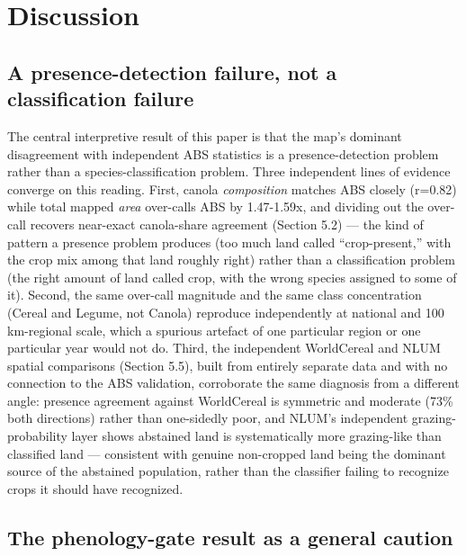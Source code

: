 
\section{Discussion}\label{discussion}

\subsection{A presence-detection failure, not a classification failure}\label{a-presence-detection-failure-not-a-classification-failure}

The central interpretive result of this paper is that the map's dominant disagreement with independent ABS statistics is a presence-detection problem rather than a species-classification problem. Three independent lines of evidence converge on this reading. First, canola \emph{composition} matches ABS closely (r=0.82) while total mapped \emph{area} over-calls ABS by 1.47-1.59x, and dividing out the over-call recovers near-exact canola-share agreement (Section 5.2) --- the kind of pattern a presence problem produces (too much land called ``crop-present,'' with the crop mix among that land roughly right) rather than a classification problem (the right amount of land called crop, with the wrong species assigned to some of it). Second, the same over-call magnitude and the same class concentration (Cereal and Legume, not Canola) reproduce independently at national and 100 km-regional scale, which a spurious artefact of one particular region or one particular year would not do. Third, the independent WorldCereal and NLUM spatial comparisons (Section 5.5), built from entirely separate data and with no connection to the ABS validation, corroborate the same diagnosis from a different angle: presence agreement against WorldCereal is symmetric and moderate (73\% both directions) rather than one-sidedly poor, and NLUM's independent grazing-probability layer shows abstained land is systematically more grazing-like than classified land --- consistent with genuine non-cropped land being the dominant source of the abstained population, rather than the classifier failing to recognize crops it should have recognized.

\subsection{The phenology-gate result as a general caution}\label{the-phenology-gate-result-as-a-general-caution}

